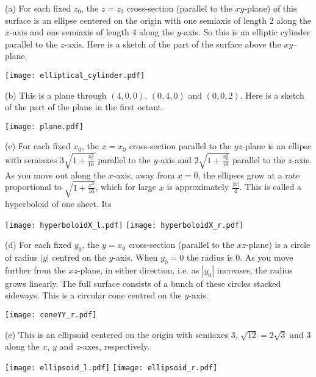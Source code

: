 \begin{solution} 
(a) 
For each fixed $z_0$, the $z=z_0$ cross-section (parallel to the $xy$-plane) 
of this surface is an ellipse centered on the origin with
one semiaxis of length 2 along the $x$-axis and one semiaxis of length 
4 along the $y$-axis. So this is an elliptic cylinder parallel to the $z$-axis.
Here is a sketch of the part of the surface above the $xy$--plane.
\begin{center}
     \texttt{[image: elliptical\_cylinder.pdf]}
\end{center}

(b)
This is a plane through $(4,0,0)$, $(0,4,0)$ and $(0,0,2)$.
Here is a sketch of the part of the plane in the first octant.
\begin{center}
     \texttt{[image: plane.pdf]}
\end{center}

(c)
For each fixed $x_0$, the $x=x_0$ 
cross-section parallel to the $yz$-plane is an ellipse with semiaxes 
$3\sqrt{1+\frac{x_0^2}{16}}$ parallel to the $y$-axis and
$2\sqrt{1+\frac{x_0^2}{16}}$ parallel to the $z$-axis. 
 As you move out along the $x$-axis, away from $x=0$, the ellipses grow
at a rate proportional to $\sqrt{1+\frac{x^2}{16}}$, which for large $x$
is approximately $\frac{|x|}{4}$.
This is called a hyperboloid of one sheet. Its 
\begin{center}
     \texttt{[image: hyperboloidX\_l.pdf]}\qquad
     \texttt{[image: hyperboloidX\_r.pdf]}
\end{center}

(d)
For each fixed $y_0$, the $y=x_0$ cross-section (parallel to the $xz$-plane) 
is a circle of radius $|y|$ centred on the $y$-axis. When $y_0=0$ the radius 
is $0$. As you move further from the $xz$-plane, in either direction, 
i.e. as $|y_0|$ increases, the radius grows linearly. The full surface 
consists of a bunch of these circles stacked sideways. This is a 
circular cone centred on the $y$-axis. 
\begin{center}
     \texttt{[image: coneYY\_r.pdf]}%
\end{center}

(e)
This is an ellipsoid centered on the origin with semiaxes $3$, 
$\sqrt{12}=2\sqrt{3}$ and $3$ along the $x$, $y$ and $z$-axes, respectively.
\begin{center}
     \texttt{[image: ellipsoid\_l.pdf]}\qquad
     \texttt{[image: ellipsoid\_r.pdf]}
\end{center}


\end{solution}
